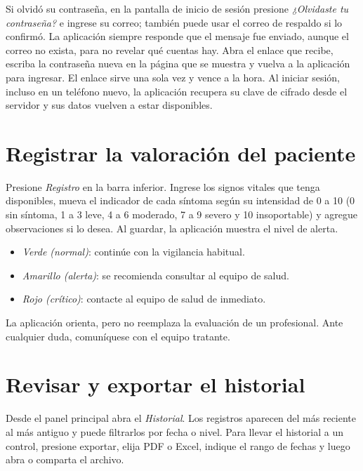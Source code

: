 Si olvidó su contraseña, en la pantalla de inicio de sesión presione
\emph{¿Olvidaste tu contraseña?} e ingrese su correo; también puede usar el
correo de respaldo si lo confirmó. La aplicación siempre responde que el mensaje
fue enviado, aunque el correo no exista, para no revelar qué cuentas hay. Abra
el enlace que recibe, escriba la contraseña nueva en la página que se muestra y
vuelva a la aplicación para ingresar. El enlace sirve una sola vez y vence a la
hora. Al iniciar sesión, incluso en un teléfono nuevo, la aplicación recupera su
clave de cifrado desde el servidor y sus datos vuelven a estar disponibles.


\section{Registrar la valoración del paciente}

Presione \emph{Registro} en la barra inferior. Ingrese los signos vitales que
tenga disponibles, mueva el indicador de cada síntoma según su intensidad de 0 a
10 (0 sin síntoma, 1 a 3 leve, 4 a 6 moderado, 7 a 9 severo y 10 insoportable)
y agregue observaciones si lo desea. Al guardar, la aplicación muestra el
nivel de alerta.

\begin{itemize}
    \item \emph{Verde (normal)}: continúe con la vigilancia habitual.
    \item \emph{Amarillo (alerta)}: se recomienda consultar al equipo de salud.
    \item \emph{Rojo (crítico)}: contacte al equipo de salud de inmediato.
\end{itemize}

La aplicación orienta, pero no reemplaza la evaluación de un profesional. Ante
cualquier duda, comuníquese con el equipo tratante.


\section{Revisar y exportar el historial}

Desde el panel principal abra el \emph{Historial}. Los registros aparecen del más
reciente al más antiguo y puede filtrarlos por fecha o nivel. Para llevar el
historial a un control, presione exportar, elija PDF o Excel, indique el rango de
fechas y luego abra o comparta el archivo.

